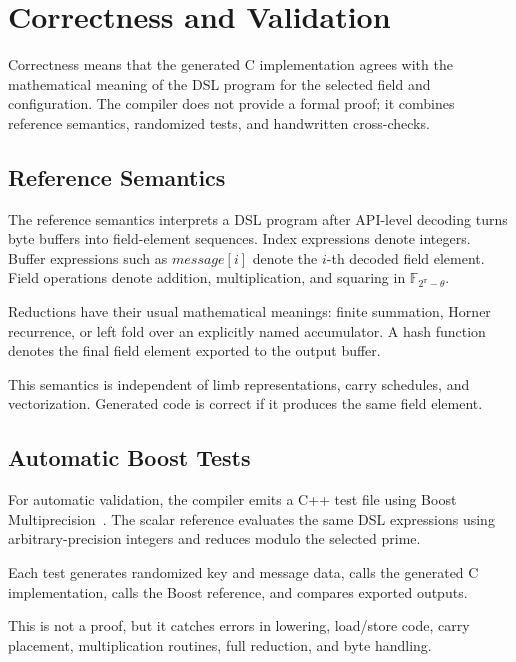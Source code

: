 \chapter{Correctness and Validation}
\label{ch:correctness-validation}

Correctness means that the generated C implementation agrees with the mathematical meaning of the DSL program for the selected field and configuration. The compiler does not provide a formal proof; it combines reference semantics, randomized tests, and handwritten cross-checks.

\section{Reference Semantics}
\label{sec:reference-semantics}

The reference semantics interprets a DSL program after API-level decoding turns byte buffers into field-element sequences. Index expressions denote integers. Buffer expressions such as \(message[i]\) denote the \(i\)-th decoded field element. Field operations denote addition, multiplication, and squaring in \(\mathbb{F}_{2^\pi-\theta}\).

Reductions have their usual mathematical meanings: finite summation, Horner recurrence, or left fold over an explicitly named accumulator. A hash function denotes the final field element exported to the output buffer.

This semantics is independent of limb representations, carry schedules, and vectorization. Generated code is correct if it produces the same field element.

\section{Automatic Boost Tests}
\label{sec:automatic-boost-tests}

For automatic validation, the compiler emits a C++ test file using Boost Multiprecision~\cite{boost}. The scalar reference evaluates the same DSL expressions using arbitrary-precision integers and reduces modulo the selected prime.

Each test generates randomized key and message data, calls the generated C implementation, calls the Boost reference, and compares exported outputs.

This is not a proof, but it catches errors in lowering, load/store code, carry placement, multiplication routines, full reduction, and byte handling.

